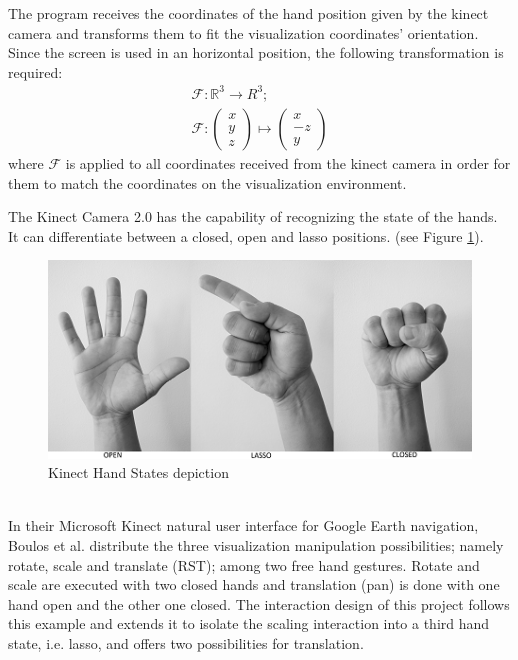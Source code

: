 \documentclass[12pt]{extarticle}
\newcommand{\R}{\mathbb{R}}
\begin{document}
The program receives the coordinates of the hand position given by the kinect camera and transforms them to fit the visualization coordinates' orientation. Since the screen is used in an horizontal position, the following transformation is required:
$$\begin{array}{c}
\mathcal F: \R^3\to R^3; \\
\mathcal F:\begin{pmatrix} x\\y\\z\end{pmatrix}\mapsto \begin{pmatrix} x\\-z\\y\end{pmatrix}\end{array}$$
where $\mathcal F$ is applied to all coordinates received from the kinect camera in order for them to match the coordinates on the visualization environment.

The Kinect Camera 2.0 has the capability of recognizing the state of the hands. It can differentiate between a closed, open and lasso positions. (see Figure \ref{fig: OCL}).
\begin{figure}[ht!]
\includegraphics[scale=1.5]{Images/KinectHandStates.png}
\caption{Kinect Hand States depiction}
\label{fig: OCL}
\end{figure}\\
In their Microsoft Kinect natural user interface for Google Earth navigation, Boulos et al. \cite{Kinoogle} distribute the three visualization manipulation possibilities; namely rotate, scale and translate (RST); among two free hand gestures. Rotate and scale are executed with two closed hands and translation (pan) is done with one hand open and the other one closed. The interaction design of this project follows this example and extends it to isolate the scaling interaction into a third hand state, i.e. lasso, and offers two possibilities for translation.
\end{document}
